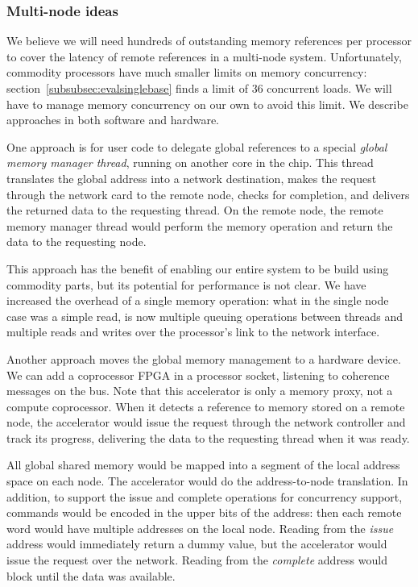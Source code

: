 \documentclass[10pt,nocopyrightspace,preprint]{sigplanconf}
\begin{document}
{\subsubsection{Multi-node ideas}

We believe we will need hundreds of outstanding memory references per processor to
cover the latency of remote references in a multi-node
system. Unfortunately, commodity processors have much smaller limits
on memory concurrency: section~\ref{subsubsec:evalsinglebase} finds a limit of
36 concurrent loads. We will have to manage memory concurrency on our
own to avoid this limit. We describe approaches in both software and
hardware.

One approach is for user code to delegate global references to a
special {\em global memory manager thread}, running on another core in
the chip. This thread translates the global address into a network
destination, makes the request through the network card to the remote
node, checks for completion, and delivers the returned data to the
requesting thread. On the remote node, the remote memory manager
thread would perform the memory operation and return the data to the
requesting node.

This approach has the benefit of enabling our entire system to be
build using commodity parts, but its potential for performance is not
clear. We have increased the overhead of a single memory operation:
what in the single node case was a simple read, is now multiple
queuing operations between threads and multiple reads and writes over
the processor's link to the network interface.

Another approach moves the global memory management to a hardware
device. We can add a coprocessor FPGA in a processor socket, listening
to coherence messages on the bus. Note that this accelerator is only a
memory proxy, not a compute coprocessor. When it detects a reference
to memory stored on a remote node, the accelerator would issue the
request through the network controller and track its progress,
delivering the data to the requesting thread when it was ready.

All global shared memory would be mapped into a segment of the local
address space on each node. The accelerator would do the
address-to-node translation. In addition, to support the issue and
complete operations for concurrency support, commands would be encoded
in the upper bits of the address: then each remote word would have multiple
addresses on the local node. Reading from the {\em issue} address would
immediately return a dummy value, but the accelerator would issue the
request over the network. Reading from the {\em complete} address
would block until the data was available.

}
\end{document}
